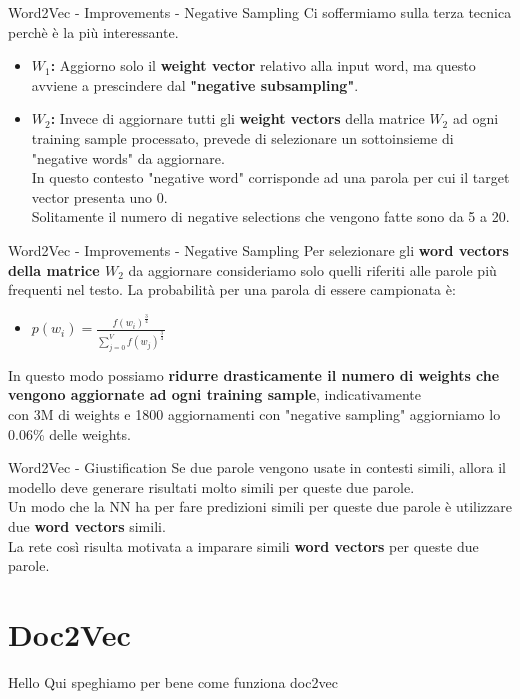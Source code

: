 \documentclass[british]{beamer}
\begin{document}
\begin{frame}{Word2Vec - Improvements - Negative Sampling}
	Ci soffermiamo sulla terza tecnica perch\`{e} \`{e} la pi\`{u} interessante.\\
	\begin{itemize}
		\item \textbf{\(W_1\): }Aggiorno solo il \textbf{weight vector} relativo alla input word, ma questo avviene a prescindere dal \textbf{"negative subsampling"}.
		\item \textbf{\(W_2\): }Invece di aggiornare tutti gli \textbf{weight vectors} della matrice \(W_2\) ad ogni training sample processato, prevede di selezionare un sottoinsieme di "negative words" da aggiornare.\\
		In questo contesto "negative word" corrisponde ad una parola per cui il target vector presenta uno 0.\\
		Solitamente il numero di negative selections che vengono fatte sono da 5 a 20.
	\end{itemize}
\end{frame}

\begin{frame}{Word2Vec - Improvements - Negative Sampling}
	Per selezionare gli \textbf{word vectors della matrice \(W_2\)} da aggiornare consideriamo solo quelli riferiti alle parole pi\`{u} frequenti nel testo.
	La probabilit\`{a} per una parola di essere campionata \`{e}:
	\begin{itemize}
		\item \(p(w_i) = \frac{f(w_i)^\frac{3}{4}}{\sum_{j=0}^{V} f(w_j)^\frac{3}{4}}\)
	\end{itemize}
	In questo modo possiamo \textbf{ridurre drasticamente il numero di weights che vengono aggiornate ad ogni training sample}, indicativamente \\con 3M di weights e 1800 aggiornamenti con "negative sampling" aggiorniamo lo 0.06\% delle weights.
\end{frame}

\begin{frame}{Word2Vec - Giustification}
	Se due parole vengono usate in contesti simili, allora il modello deve generare risultati molto simili per queste due parole.\\
	Un modo che la NN ha per fare predizioni simili per queste due parole \`{e} utilizzare due \textbf{word vectors} simili.\\
	La rete cos\`{i} risulta motivata a imparare simili \textbf{word vectors} per queste due parole.
\end{frame}

\section{Doc2Vec}

\begin{frame}{Hello}
	Qui speghiamo per bene come funziona doc2vec
\end{frame}
\end{document}
